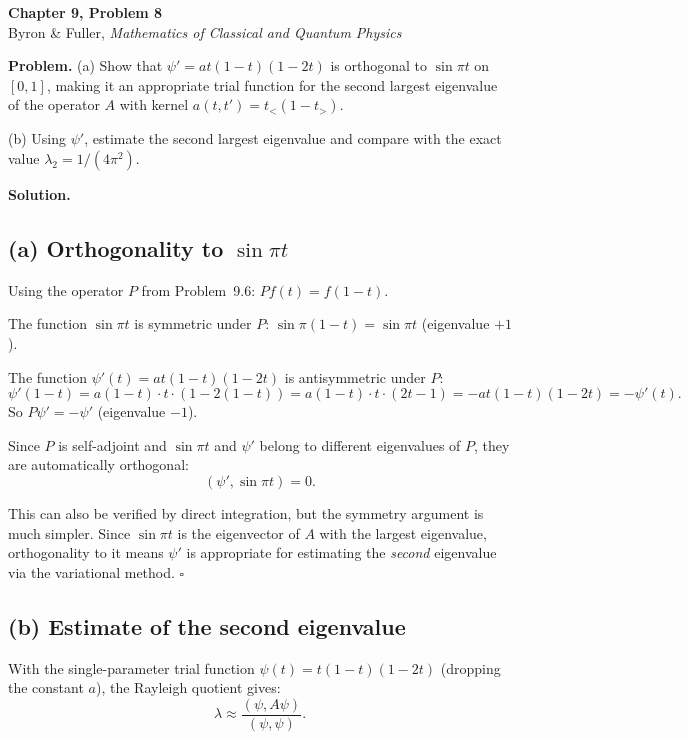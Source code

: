 \documentclass[12pt]{article}
\begin{document}
\begin{center}
{\Large\bfseries Chapter 9, Problem 8}\\[6pt]
Byron \& Fuller, \textit{Mathematics of Classical and Quantum Physics}
\end{center}

\bigskip

\textbf{Problem.} (a) Show that $\psi' = at(1-t)(1-2t)$ is orthogonal to $\sin\pi t$ on $[0,1]$, making it an appropriate trial function for the second largest eigenvalue of the operator $A$ with kernel $a(t,t') = t_<(1-t_>)$.

(b) Using $\psi'$, estimate the second largest eigenvalue and compare with the exact value $\lambda_2 = 1/(4\pi^2)$.

\bigskip
\textbf{Solution.}

\subsection*{(a) Orthogonality to $\sin\pi t$}

Using the operator $P$ from Problem~9.6: $Pf(t) = f(1-t)$.

The function $\sin\pi t$ is symmetric under $P$: $\sin\pi(1-t) = \sin\pi t$ (eigenvalue $+1$).

The function $\psi'(t) = at(1-t)(1-2t)$ is antisymmetric under $P$:
\[
\psi'(1-t) = a(1-t)\cdot t\cdot(1-2(1-t)) = a(1-t)\cdot t\cdot(2t-1) = -at(1-t)(1-2t) = -\psi'(t).
\]
So $P\psi' = -\psi'$ (eigenvalue $-1$).

Since $P$ is self-adjoint and $\sin\pi t$ and $\psi'$ belong to different eigenvalues of $P$, they are automatically orthogonal:
\[
(\psi', \sin\pi t) = 0.
\]

This can also be verified by direct integration, but the symmetry argument is much simpler. Since $\sin\pi t$ is the eigenvector of $A$ with the largest eigenvalue, orthogonality to it means $\psi'$ is appropriate for estimating the \emph{second} eigenvalue via the variational method. \hfill $\square$

\subsection*{(b) Estimate of the second eigenvalue}

With the single-parameter trial function $\psi(t) = t(1-t)(1-2t)$ (dropping the constant $a$), the Rayleigh quotient gives:
\[
\lambda \approx \frac{(\psi, A\psi)}{(\psi, \psi)}.
\]
\end{document}
